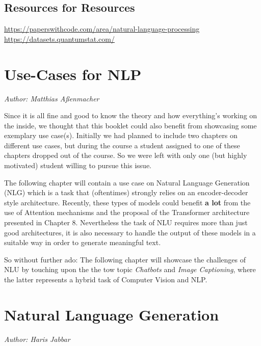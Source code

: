 \documentclass[]{krantz}
\begin{document}
\hypertarget{resources-for-resources}{%
\section{Resources for Resources}\label{resources-for-resources}}

\url{https://paperswithcode.com/area/natural-language-processing}
\url{https://datasets.quantumstat.com/}

\hypertarget{use-cases-for-nlp}{%
\chapter{Use-Cases for NLP}\label{use-cases-for-nlp}}

\emph{Author: Matthias Aßenmacher}




Since it is all fine and good to know the theory and how everything's working on the inside,
we thought that this booklet could also benefit from showcasing some exemplary use case(s).
Initially we had planned to include two chapters on different use cases, but during the course
a student assigned to one of these chapters dropped out of the course. So we were left with only
one (but highly motivated) student willing to pursue this issue.

The following chapter will contain a use case on Natural Language Generation (NLG) which is a task
that (oftentimes) strongly relies on an encoder-decoder style architecture. Recently, these types
of models could benefit \textbf{a lot} from the use of Attention mechanisms \citep{bahdanau2014neural} and the
proposal of the Transformer architecture \citep{vaswani2017attention} presented in Chapter 8.
Nevertheless the task of NLU requires more than just good architectures, it is also necessary to
handle the output of these models in a suitable way in order to generate meaningful text.

So without further ado: The following chapter will showcase the challenges of NLU by touching upon
the the tow topic \emph{Chatbots} and \emph{Image Captioning}, where the latter represents a hybrid task of
Computer Vision and NLP.

\hypertarget{natural-language-generation}{%
\chapter{Natural Language Generation}\label{natural-language-generation}}

\emph{Author: Haris Jabbar}
\end{document}
